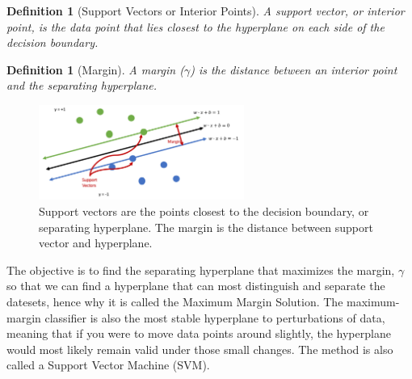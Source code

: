 \documentclass[11pt]{article}
\newtheorem{definition}[theorem]{Definition}
\begin{document}
\begin{definition}[Support Vectors or Interior Points]
A support vector, or interior point, is the data point that lies closest to the hyperplane on each side of the decision boundary.
\end{definition}

\begin{definition}[Margin]
A margin ($\gamma$) is the distance between an interior point and the separating hyperplane. 
\end{definition}

\begin{figure}[H]
    \centering
    \includegraphics[width=0.6\textwidth]{images/margin_def.png}
    \caption{Support vectors are the points closest to the decision boundary, or separating hyperplane. The margin is the distance between support vector and hyperplane.}
    \label{fig:support_vectors}
\end{figure}

The objective is to find the separating hyperplane that maximizes the margin, $\gamma$ so that we can find a hyperplane that can most distinguish and separate the datesets, hence why it is called the Maximum Margin Solution. The maximum-margin classifier is also the most stable hyperplane to perturbations of data, meaning that if you were to move data points around slightly, the hyperplane would most likely remain valid under those small changes. The method is also called a Support Vector Machine (SVM).
\end{document}
